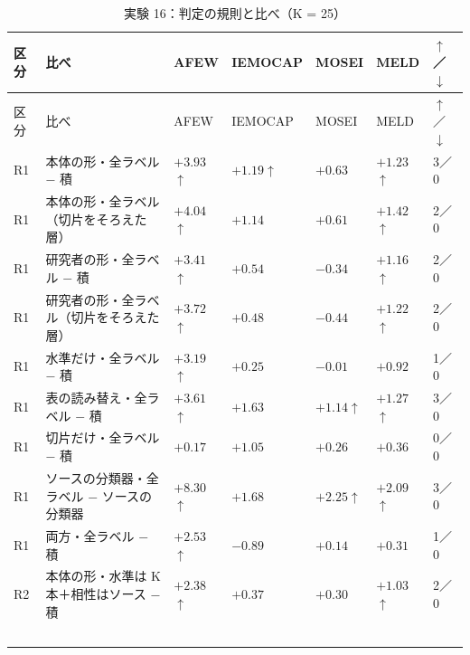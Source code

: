 \begin{longtable}{>{\raggedright}p{0.75cm}>{\raggedright}p{5.6cm}>{\raggedright}p{2.05cm}>{\raggedright}p{2.05cm}>{\raggedright}p{2.05cm}>{\raggedright}p{2.05cm}p{0.75cm}}
\caption{実験 16：判定の規則と比べ（K = 25）}\\
\toprule
区分 & 比べ & AFEW & IEMOCAP & MOSEI & MELD & $\uparrow$／$\downarrow$ \\
\midrule
\endfirsthead
\toprule
区分 & 比べ & AFEW & IEMOCAP & MOSEI & MELD & $\uparrow$／$\downarrow$ \\
\midrule
\endhead
\bottomrule
\endfoot

R1 & 本体の形・全ラベル $-$ 積 & $+3.93$$\uparrow$\newline{\tiny [$+$1.6, $+$6.3]} & $+1.19$$\uparrow$\newline{\tiny [$+$0.3, $+$2.1]} & $+0.63$\newline{\tiny [$+$0.3, $+$0.9]} & $+1.23$$\uparrow$\newline{\tiny [$+$0.6, $+$1.8]} & 3／0 \\
R1 & 本体の形・全ラベル（切片をそろえた層） & $+4.04$$\uparrow$ & $+1.14$ & $+0.61$ & $+1.42$$\uparrow$ & 2／0 \\
R1 & 研究者の形・全ラベル $-$ 積 & $+3.41$$\uparrow$ & $+0.54$ & $-0.34$ & $+1.16$$\uparrow$ & 2／0 \\
R1 & 研究者の形・全ラベル（切片をそろえた層） & $+3.72$$\uparrow$ & $+0.48$ & $-0.44$ & $+1.22$$\uparrow$ & 2／0 \\
R1 & 水準だけ・全ラベル $-$ 積 & $+3.19$$\uparrow$ & $+0.25$ & $-0.01$ & $+0.92$ & 1／0 \\
R1 & 表の読み替え・全ラベル $-$ 積 & $+3.61$$\uparrow$ & $+1.63$ & $+1.14$$\uparrow$ & $+1.27$$\uparrow$ & 3／0 \\
R1 & 切片だけ・全ラベル $-$ 積 & $+0.17$ & $+1.05$ & $+0.26$ & $+0.36$ & 0／0 \\
R1 & ソースの分類器・全ラベル $-$ ソースの分類器 & $+8.30$$\uparrow$ & $+1.68$ & $+2.25$$\uparrow$ & $+2.09$$\uparrow$ & 3／0 \\
R1 & 両方・全ラベル $-$ 積 & $+2.53$$\uparrow$ & $-0.89$ & $+0.14$ & $+0.31$ & 1／0 \\
R2 & 本体の形・水準は K 本＋相性はソース $-$ 積 & $+2.38$$\uparrow$\newline{\tiny [$+$1.1, $+$3.7]} & $+0.37$\newline{\tiny [$-$0.0, $+$0.8]} & $+0.30$\newline{\tiny [$-$0.2, $+$0.8]} & $+1.03$$\uparrow$\newline{\tiny [$+$0.1, $+$2.0]} & 2／0 \\
$$
\end{longtable}
